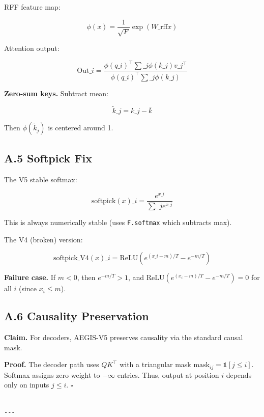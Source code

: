 RFF feature map:

\[
\phi(x) = \frac{1}{\sqrt{F}} \exp(W\_\text{rff} x)
\]

Attention output:

\[
\text{Out}\_i = \frac{\phi(q\_i)^\top \sum\_j \phi(k\_j) v\_j^\top}{\phi(q\_i)^\top \sum\_j \phi(k\_j)}
\]

\textbf{Zero-sum keys.} Subtract mean:

\[
\tilde{k}\_j = k\_j - \bar{k}
\]

Then $\phi(\tilde{k}_j)$ is centered around 1.

\subsection{A.5 Softpick Fix}

The V5 stable softmax:

\[
\text{softpick}(x)\_i = \frac{e^{x\_i}}{\sum\_j e^{x\_j}}
\]

This is always numerically stable (uses \texttt{F.softmax} which subtracts max).

The V4 (broken) version:

\[
\text{softpick}\_\text{V4}(x)\_i = \text{ReLU}\!\left(e^{(x\_i - m)/T} - e^{-m/T}\right)
\]

\textbf{Failure case.} If $m < 0$, then $e^{-m/T} > 1$, and 
$\text{ReLU}(e^{(x_i - m)/T} - e^{-m/T}) = 0$ for all $i$ (since 
$x_i \leq m$).

\subsection{A.6 Causality Preservation}

\textbf{Claim.} For decoders, AEGIS-V5 preserves causality via the standard 
causal mask.

\textbf{Proof.} The decoder path uses $Q K^\top$ with a triangular mask 
$\text{mask}_{ij} = \mathbb{1}[j \leq i]$. Softmax assigns zero weight to 
$-\infty$ entries. Thus, output at position $i$ depends only on inputs 
$j \leq i$. $\square$
\begin{lstlisting}

---
\end{lstlisting}